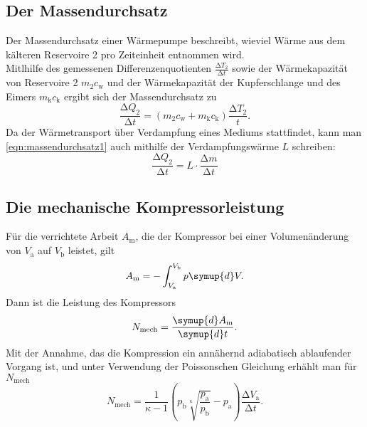\documentclass{scrartcl} %
\begin{document}
	\subsection{Der Massendurchsatz}
	Der Massendurchsatz einer Wärmepumpe beschreibt, wieviel Wärme aus dem kälteren Reservoire 2 pro Zeiteinheit entnommen wird. \\
	Mitlhilfe des gemessenen Differenzenquotienten $ \frac{\increment T_\text{2}}{\increment t}$ sowie der Wärmekapazität von Reservoire 2
	$m_\text{2}c_\text{w}$ und der Wärmekapazität der Kupferschlange und des Eimers $m_\text{k}c_\text{k}$ ergibt sich der Massendurchsatz
	zu
	\begin{equation}
		\frac{\increment Q_\text{2}}{\increment t} = (m_\text{2} c_\text{w} + m_\text{k} c_\text{k}) \frac{\increment T_\text{2}}{t}.
		\label{eqn:massendurchsatz1}
	\end{equation}
	Da der Wärmetransport über Verdampfung eines Mediums stattfindet, kann man \eqref{eqn:massendurchsatz1} auch mithilfe der
	Verdampfungswärme $L$ schreiben:
	\begin{equation}
		\frac{\increment Q_\text{2}}{\increment t} = L \cdot \frac{\increment m}{\increment t}
		\label{eqn:massendurchsatz2}
	\end{equation}
  \subsection{Die mechanische Kompressorleistung}
  Für die verrichtete Arbeit $A_\text{m}$, die der Kompressor bei einer Volumenänderung von $V_\text{a}$ auf $V_\text{b}$ leistet, gilt
  \begin{equation}
    A_\text{m} = -\int_{V_\text{a}}^{V_\text{b}} p \symup{d}V.
  \label{eqn:arbeitkompressor}
  \end{equation}
  Dann ist die Leistung des Kompressors
  \begin{equation}
    N_\text{mech} = \frac{\symup{d} A_\text{m}}{\symup{d} t}.
    \label{eqn:leistungkompressor1}
  \end{equation}
  Mit der Annahme, das die Kompression ein annähernd adiabatisch ablaufender Vorgang ist, und unter Verwendung der Poissonschen Gleichung erhählt man für $N_\text{mech}$
  \begin{equation}
    N_\text{mech} = \frac{1}{\kappa - 1}  \left(p_\text{b} \sqrt[\kappa]{\frac{p_\text{a}}{p_\text{b}}} - p_\text{a} \right)  \frac{\increment V_\text{a}}{\increment t}.
    \label{eqn:leistungkompressor2}
  \end{equation}
\end{document}
